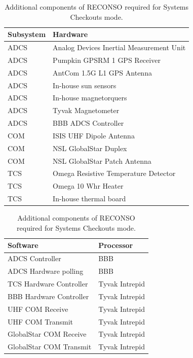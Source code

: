 \documentclass{article}
\begin{document}
\begin{table}[h!]
\caption{Additional components of RECONSO required for Systems Checkouts mode.}
\begin{adjustbox}{center}
\begin{tabular}{|l|l|}
\hline
Subsystem & Hardware \\ \hline \hline
ADCS & Analog Devices Inertial Measurement Unit  \\ \hline
ADCS & Pumpkin GPSRM 1 GPS Receiver \\ \hline
ADCS & AntCom 1.5G L1 GPS Antenna  \\ \hline
ADCS & In-house sun sensors  \\ \hline
ADCS & In-house magnetorquers  \\ \hline
ADCS & Tyvak Magnetometer \\ \hline
ADCS & BBB ADCS Controller \\ \hline \hline
COM & ISIS UHF Dipole Antenna  \\ \hline
COM & NSL GlobalStar Duplex  \\ \hline
COM & NSL GlobalStar Patch Antenna \\ \hline \hline
TCS & Omega Resistive Temperature Detector \\ \hline
TCS & Omega 10 Whr Heater  \\ \hline
TCS & In-house thermal board \\ \hline
\end{tabular}

\quad

\begin{tabular}{|l|l|}
\hline
Software & Processor \\ \hline \hline
ADCS Controller & BBB \\ \hline
ADCS Hardware polling & BBB \\ \hline \hline
TCS Hardware Controller & Tyvak Intrepid \\ \hline
BBB Hardware Controller & Tyvak Intrepid \\ \hline
UHF COM Receive & Tyvak Intrepid \\ \hline
UHF COM Transmit & Tyvak Intrepid \\ \hline
GlobalStar COM Receive & Tyvak Intrepid \\ \hline
GlobalStar COM Transmit & Tyvak Intrepid \\ \hline
\end{tabular}
\end{adjustbox}
\end{table}
\end{document}
